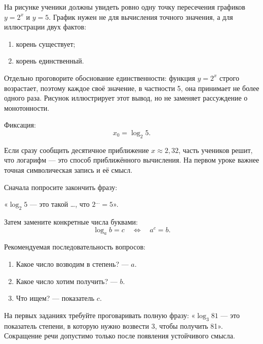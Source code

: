 
На рисунке ученики должны увидеть ровно одну точку пересечения графиков
\(y=2^x\) и \(y=5\). График нужен не для вычисления точного значения, а
для иллюстрации двух фактов:
\begin{enumerate}
  \item корень существует;
  \item корень единственный.
\end{enumerate}

Отдельно проговорите обоснование единственности: функция \(y=2^x\)
строго возрастает, поэтому каждое своё значение, в частности 5, она
принимает не более одного раза. Рисунок иллюстрирует этот вывод, но не
заменяет рассуждение о монотонности.

Фиксация:
\[
  x_0=\log_2 5.
\]

\begin{warningbox}
  Если сразу сообщить десятичное приближение \(x\approx2{,}32\), часть
  учеников решит, что логарифм --- это способ приближённого вычисления.
  На первом уроке важнее точная символическая запись и её смысл.
\end{warningbox}


Сначала попросите закончить фразу:

\begin{center}
  «\(\log_2 5\) --- это такой \ldots, что \(2^{\ldots}=5\)».
\end{center}

Затем замените конкретные числа буквами:
\[
  \log_a b=c
  \quad\Longleftrightarrow\quad
  a^c=b.
\]

Рекомендуемая последовательность вопросов:
\begin{enumerate}
  \item Какое число возводим в степень? --- \(a\).
  \item Какое число хотим получить? --- \(b\).
  \item Что ищем? --- показатель \(c\).
\end{enumerate}

\begin{teacherbox}
  На первых заданиях требуйте проговаривать полную фразу:
  «\(\log_3 81\) --- это показатель степени, в которую нужно возвести 3,
  чтобы получить 81». Сокращение речи допустимо только после появления
  устойчивого смысла.
\end{teacherbox}

